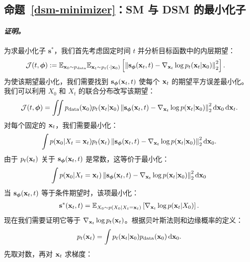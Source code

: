 \subsection{命题~\ref{dsm-minimizer}：SM 与 DSM 的最小化子}\label{app-sec:min-dsm}

\paragraph{\textit{证明。}} 为求最小化子 $\mathbf{s}^*$，我们首先考虑固定时间 $t$ 并分析目标函数中的内层期望：
\begin{align*}
\mathcal  J(t, \bm{\phi}) 
&:= \mathbb{E}_{{\mathbf{x}}_0 \sim p_{\text{data}}} 
\mathbb{E}_{{\mathbf{x}}_t \sim p_t(\cdot|{\mathbf{x}}_0)} 
\left[\left\| \mathbf{s}_{\bm{\phi}}({\mathbf{x}}_t, t) - \nabla_{{\mathbf{x}}_t} \log p_t({\mathbf{x}}_t|{\mathbf{x}}_0) \right\|_2^2 \right].
\end{align*}
为使该期望最小化，我们需要找到
$\mathbf{s}_{\bm{\phi}}({\mathbf{x}}_t, t)$
使每个 ${\mathbf{x}}_t$ 的期望平方误差最小化。
我们可以利用 $X_0$ 和 $X_t$ 的联合分布改写该期望：
\begin{align*}
\mathcal J(t, \bm{\phi}) 
= \iint p_{\text{data}}({\mathbf{x}}_0) p_t({\mathbf{x}}_t |{\mathbf{x}}_0) 
\left\| \mathbf{s}_{\bm{\phi}}({\mathbf{x}}_t, t) - \nabla_{{\mathbf{x}}_t} \log p({\mathbf{x}}_t |  {\mathbf{x}}_0) \right\|_2^2 
 \mathop{}\!\mathrm{d}{\mathbf{x}}_0  \mathop{}\!\mathrm{d}{\mathbf{x}}_t.
\end{align*}
对每个固定的 ${\mathbf{x}}_t$，我们需要最小化：
\begin{align*}
\int p({\mathbf{x}}_0 | X_t = {\mathbf{x}}_t) p_t( {\mathbf{x}}_t) 
\left\| \mathbf{s}_{\bm{\phi}}({\mathbf{x}}_t, t) - \nabla_{{\mathbf{x}}_t} \log p({\mathbf{x}}_t |  {\mathbf{x}}_0) \right\|_2^2 
 \mathop{}\!\mathrm{d}{\mathbf{x}}_0.
\end{align*}
由于 $p_t({\mathbf{x}}_t)$ 关于
$\mathbf{s}_{\bm{\phi}}({\mathbf{x}}_t, t)$ 是常数，这等价于最小化：
\begin{align*}
\int p( {\mathbf{x}}_0 | X_t = {\mathbf{x}}_t) 
\left\| \mathbf{s}_{\bm{\phi}}({\mathbf{x}}_t, t) - \nabla_{{\mathbf{x}}_t} \log p({\mathbf{x}}_t |  {\mathbf{x}}_0) \right\|_2^2 
  \mathop{}\!\mathrm{d}{\mathbf{x}}_0
\end{align*}
当 $\mathbf{s}_{\bm{\phi}}({\mathbf{x}}_t, t)$ 等于条件期望时，该项最小化：
\begin{align*}
\mathbf{s}^*({\mathbf{x}}_t, t) 
= \mathbb{E}_{X_0 \sim p(X_0 | X_t = {\mathbf{x}}_t)} 
\left[ \nabla_{{\mathbf{x}}_t} \log p({\mathbf{x}}_t | X_0) \right].
\end{align*}
现在我们需要证明它等于
$\nabla_{{\mathbf{x}}_t} \log p_t({\mathbf{x}}_t)$。根据贝叶斯法则和边缘概率的定义：
\begin{align*}
p_t({\mathbf{x}}_t) 
= \int p_t({\mathbf{x}}_t | {\mathbf{x}}_0) 
p_{\text{data}}({\mathbf{x}}_0)   \mathop{}\!\mathrm{d}{\mathbf{x}}_0.
\end{align*}
先取对数，再对 ${\mathbf{x}}_t$ 求梯度：
